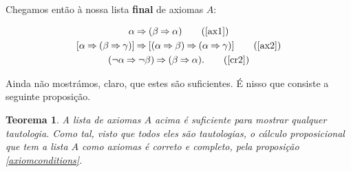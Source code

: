 \documentclass{report}
\newtheorem{teorema}{Teorema}
\theoremstyle{definition}
\theoremstyle{remark}
\newcommand{\imply}{\mathbin{\Rightarrow}}
\begin{document}
	Chegamos então à nossa lista \textbf{final} de axiomas $A$:
	
	\begin{gather}\label{prop:axiomasfinais}
	\alpha \imply (\beta \imply \alpha) \tag{\ref{ax1}}\\
	[\alpha \imply (\beta \imply \gamma)] \imply [(\alpha \imply \beta) \imply (\alpha \imply \gamma)]\tag{\ref{ax2}}\\
	(\neg \alpha \imply \neg \beta) \imply (\beta \imply \alpha).\tag{\ref{cr2}}
	\end{gather}
	
	Ainda não mostrámos, claro, que estes são suficientes. É nisso que consiste a seguinte proposição.
	
	\begin{teorema}
	A lista de axiomas $A$ acima é suficiente para mostrar qualquer tautologia. Como tal, visto que todos eles são tautologias, o cálculo proposicional que tem a lista $A$ como axiomas é correto e completo, pela proposição \ref{axiomconditions}.
	\end{teorema}
	
\end{document}
